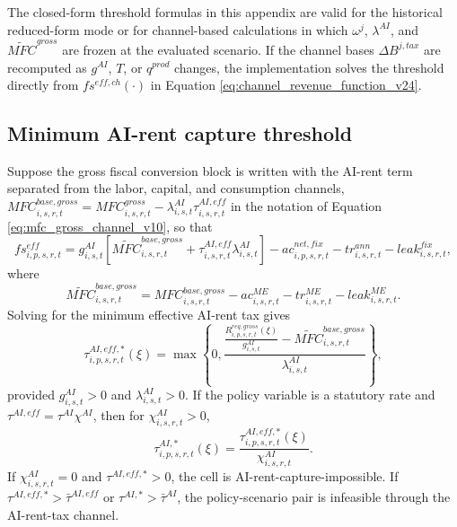 \documentclass[11pt,a4paper]{article}
\begin{document}
The closed-form threshold formulas in this appendix are valid for the historical reduced-form mode or for channel-based calculations in which $\omega^j$, $\lambda^{AI}$, and $\widetilde{MFC}^{gross}$ are frozen at the evaluated scenario. If the channel bases $\Delta B^{j,tax}$ are recomputed as $g^{AI}$, $T$, or $q^{prod}$ changes, the implementation solves the threshold directly from $fs^{eff,ch}(\cdot)$ in Equation \eqref{eq:channel_revenue_function_v24}.

\subsection{Minimum AI-rent capture threshold}

Suppose the gross fiscal conversion block is written with the AI-rent term separated from the labor, capital, and consumption channels, $MFC^{base,gross}_{i,s,r,t}=MFC^{gross}_{i,s,r,t}-\lambda^{AI}_{i,s,t}\tau^{AI,eff}_{i,s,r,t}$ in the notation of Equation \eqref{eq:mfc_gross_channel_v10}, so that
\begin{equation}
    fs^{eff}_{i,p,s,r,t}=g^{AI}_{i,s,t}\left[\widetilde{MFC}^{base,gross}_{i,s,r,t}+\tau^{AI,eff}_{i,s,r,t}\lambda^{AI}_{i,s,t}\right]-ac^{net,fix}_{i,p,s,r,t}-tr^{ann}_{i,s,r,t}-leak^{fix}_{i,s,r,t},
\end{equation}
where
\begin{equation}
    \widetilde{MFC}^{base,gross}_{i,s,r,t}=MFC^{base,gross}_{i,s,r,t}-ac^{ME}_{i,s,r,t}-tr^{ME}_{i,s,r,t}-leak^{ME}_{i,s,r,t}.
\end{equation}
Solving for the minimum effective AI-rent tax gives
\begin{equation}\label{eq:tau_ai_eff_star_v10}
    \tau^{AI,eff,*}_{i,p,s,r,t}(\xi)=
    \max\left\{0,
    \frac{\frac{R^{req,gross}_{i,p,s,r,t}(\xi)}{g^{AI}_{i,s,t}}-\widetilde{MFC}^{base,gross}_{i,s,r,t}}
    {\lambda^{AI}_{i,s,t}}
    \right\},
\end{equation}
provided $g^{AI}_{i,s,t}>0$ and $\lambda^{AI}_{i,s,t}>0$. If the policy variable is a statutory rate and $\tau^{AI,eff}=\tau^{AI}\chi^{AI}$, then for $\chi^{AI}_{i,s,r,t}>0$,
\begin{equation}\label{eq:tau_ai_stat_star_v10}
    \tau^{AI,*}_{i,p,s,r,t}(\xi)=\frac{\tau^{AI,eff,*}_{i,p,s,r,t}(\xi)}{\chi^{AI}_{i,s,r,t}}.
\end{equation}
If $\chi^{AI}_{i,s,r,t}=0$ and $\tau^{AI,eff,*}>0$, the cell is AI-rent-capture-impossible. If $\tau^{AI,eff,*}>\bar\tau^{AI,eff}$ or $\tau^{AI,*}>\bar\tau^{AI}$, the policy-scenario pair is infeasible through the AI-rent-tax channel.
\end{document}
